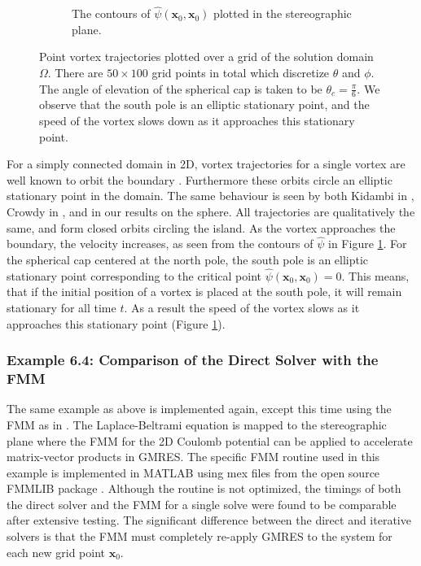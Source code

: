 \documentclass{sfuthesis}
\begin{document}
\begin{figure}[h]
\begin{subfigure}[b]{0.4\textwidth}
                \caption{The contours of $\hat{\psi}(\mathbf{x}_0, \mathbf{x}_0)$ plotted in the stereographic plane.}
        \end{subfigure}
         \caption{Point vortex trajectories plotted over a grid of the solution domain $\Omega$. There are $50 \times 100$ grid points in total which discretize $\theta$ and $\phi$. The angle of elevation of the spherical cap is taken to be $\theta_c=\frac{\pi}{6}$. We observe that the south pole is an elliptic stationary point, and the speed of the vortex slows down as it approaches this stationary point.}
       \label{fig: Ex6-3CapTrajectory}
\end{figure}

For a simply connected domain in 2D, vortex trajectories for a single vortex are well known to orbit the boundary \cite{FluchGust97}. Furthermore these orbits circle an elliptic stationary point in the domain. The same behaviour is seen by both Kidambi in \cite{Kid2000}, Crowdy in \cite{Crowdy2006}, and in our results on the sphere. All trajectories are qualitatively the same, and form closed orbits circling the island. As the vortex approaches the boundary, the velocity increases, as seen from the contours of $\hat{\psi}$ in Figure \ref{fig: Ex6-3CapTrajectory}. For the spherical cap centered at the north pole,  the south pole is an elliptic stationary point corresponding to the critical point $\hat{\psi}(\mathbf{x}_0, \mathbf{x}_0)=0$. This means, that if the initial position of a vortex is placed at the south pole, it will remain stationary for all time $t$. As a result the speed of the vortex slows as it approaches this stationary point (Figure \ref{fig: Ex6-3CapTrajectory}). 


\subsubsection{Example 6.4: Comparison of the Direct Solver with the FMM}
The same example as above is implemented again, except this time using the FMM as in \cite{KropNig2014}. The Laplace-Beltrami equation is mapped to the stereographic plane where the FMM for the 2D Coulomb potential can be applied to accelerate matrix-vector products in GMRES. The specific FMM routine used in this example is implemented in MATLAB using mex files from the open source FMMLIB package \cite{FMMLIB}. Although the routine is not optimized, the timings of both the direct solver and the FMM for a single solve were found to be comparable after extensive testing. The significant difference between the direct and iterative solvers is that the FMM must completely re-apply GMRES to the system for each new grid point $\mathbf{x}_0$. 
\end{document}

